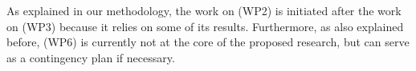 \documentclass[11pt,dvipsnames,usenames,a4paper]{article}
\begin{document}
As explained in our methodology, the work on (WP2) is initiated after the work on (WP3) because it relies on some of its results. Furthermore, as also explained before, (WP6) is currently not at the core of the proposed research, but can serve as a contingency plan if necessary.

\end{document}
